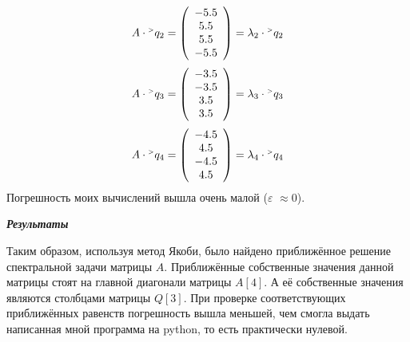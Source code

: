 \documentclass[12pt]{article}
\begin{document}
\begin{equation*}
	A \cdot {}^\mathsmaller{>} {q}_2 = \left(
	\begin{array}{c}
		-5.5 \\ 5.5 \\ 5.5 \\ -5.5 \\  
	\end{array}
	\right) = 
	\lambda_2 \cdot {}^\mathsmaller{>} {q}_2
\end{equation*}
\begin{equation*}
	A \cdot {}^\mathsmaller{>} {q}_3 = \left(
	\begin{array}{c}
		-3.5 \\ -3.5 \\ 3.5 \\ 3.5 \\ 
	\end{array}
	\right) = 
	\lambda_3 \cdot {}^\mathsmaller{>} {q}_3
\end{equation*}
\begin{equation*}
	A \cdot {}^\mathsmaller{>} {q}_4 = \left(
	\begin{array}{c}
		-4.5 \\ 4.5 \\ -4.5 \\ 4.5 \\
	\end{array}
	\right) = 
	\lambda_4 \cdot {}^\mathsmaller{>} {q}_4
\end{equation*}
Погрешность моих вычислений вышла очень малой ($\varepsilon$ $\approx 0$).
\begin{center}
	\textbf{\textit{Результаты}}
\end{center}
Таким образом, используя метод Якоби, было найдено приближённое решение спектральной задачи матрицы $A$. Приближённые собственные значения данной матрицы стоят на главной диагонали матрицы $A[4]$. А её собственные значения являются столбцами матрицы $Q[3]$. При проверке соответствующих приближённых равенств погрешность вышла меньшей, чем смогла выдать написанная мной программа на python, то есть практически нулевой.
\end{document}

